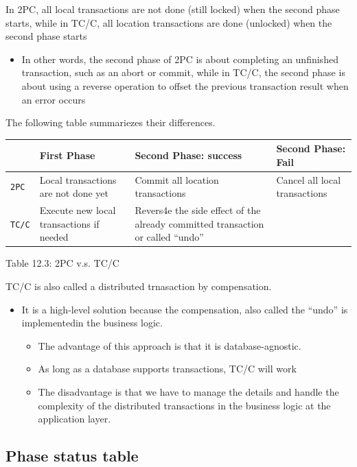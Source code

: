 \documentclass{report}
\theoremstyle{definition}
\let\oldsubsection\subsection
\renewcommand{\subsection}{\oldsubsection*}
\begin{document}
In 2PC, all local transactions are not done (still locked) when the second phase starts, while in TC/C, all location transactions are done (unlocked) when the second phase starts

\begin{itemize}
\item
In other words, the second phase of 2PC is about completing an unfinished transaction, such as an abort or commit, while in TC/C, the second phase is about using a reverse operation to offset the previous transaction result when an error occurs
\end{itemize}

The following table summariezes their differences.

\begin{tabular}{|p{3.5cm}|p{3.5cm}|p{3.5cm}|p{3.5cm}|}
\hline
 & First Phase & Second Phase: success & Second Phase: Fail\\
\hline
\lstinline|2PC| & Local transactions are not done yet & Commit all location transactions & Cancel all local transactions\\
\hline
  \lstinline|TC/C| & Execute new local transactions if needed & Revers4e the side effect of the already committed transaction or called ``undo''\\
\hline
\end{tabular}

Table 12.3: 2PC v.s. TC/C

TC/C is also called a distributed trnasaction by compensation.

\begin{itemize}
\item
It is a high-level solution because the compensation, also called the ``undo'' is implementedin the business logic.

\begin{itemize}
\item
The advantage of this approach is that it is database-agnostic.
\item
As long as a database supports transactions, TC/C will work
\item
The disadvantage is that we have to manage the details and handle the complexity of the distributed transactions in the business logic at the application layer.
\end{itemize}
\end{itemize}

\subsection{Phase status table}
\end{document}
